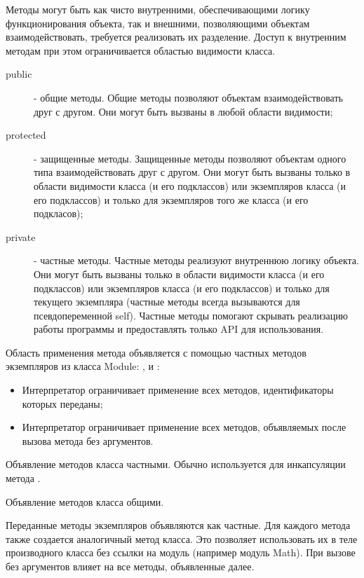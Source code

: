 Методы могут быть как чисто внутренними, обеспечивающими логику функционирования объекта, так и внешними, позволяющими объектам взаимодействовать, требуется реализовать их разделение. Доступ к внутренним методам при этом ограничивается областью видимости класса.

\begin{description}
  \item[public]    - общие методы. Общие методы позволяют объектам взаимодействовать друг с другом. Они могут быть вызваны в любой области видимости;

  \item[protected] - защищенные методы. Защищенные методы позволяют объектам одного типа взаимодействовать друг с другом. Они могут быть вызваны только в области видимости класса (и его подклассов) или экземпляров класса (и его подклассов) и только для экземпляров того же класса (и его подкласов);

  \item[private]   - частные методы. Частные методы реализуют внутреннюю логику объекта. Они могут быть вызваны только в области видимости  класса (и его подклассов) или экземпляров класса (и его подклассов) и только для текущего экземпляра (частные методы всегда вызываются для псевдопеременной self). Частные методы помогают скрывать реализацию работы программы и предоставлять только API для использования.
\end{description}

Область применения метода объявляется с помощью частных методов экземпляров из класса Module: ,  и :
\begin{itemize}
  \item Интерпретатор ограничивает применение всех методов, идентификаторы которых переданы;

  \item Интерпретатор ограничивает применение всех методов, объявляемых после вызова метода без аргументов.
\end{itemize}

\begin{methodlist}
  Объявление методов класса частными. Обычно используется для инкапсуляции метода .

  Объявление методов класса общими. 

  Переданные методы экземпляров объявляются как частные. Для каждого метода также создается аналогичный метод класса. Это позволяет использовать их в теле производного класса без ссылки на модуль (например модуль Math). При вызове без аргументов влияет на все методы, объявленные далее.  
\end{methodlist}

